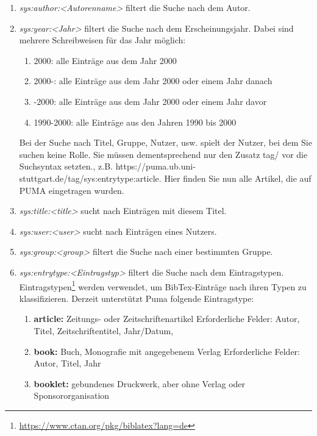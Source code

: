\documentclass[a4paper,11pt,twoside]{scrbook}
\begin{document}
\begin{enumerate}
    \item \textit{sys:author:<Autorenname>} filtert die Suche nach dem Autor.
    \item \textit{sys:year:<Jahr>} filtert die Suche nach dem Erscheinungsjahr. Dabei sind mehrere Schreibweisen für das Jahr möglich:
    \begin{enumerate}
        \item 2000: alle Einträge aus dem Jahr 2000
        \item 2000-: alle Einträge aus dem Jahr 2000 oder einem Jahr danach
        \item -2000: alle Einträge aus dem Jahr 2000 oder einem Jahr davor
        \item 1990-2000: alle Einträge aus den Jahren 1990 bis 2000
    \end{enumerate}
Bei der Suche nach Titel, Gruppe, Nutzer, usw. spielt der Nutzer, bei dem Sie suchen keine Rolle. Sie müssen dementsprechend nur den Zusatz tag/ vor die Suchsyntax setzten., z.B.  https://puma.ub.uni-stuttgart.de/tag/sys:entrytype:article. Hier finden Sie nun alle Artikel, die auf PUMA eingetragen wurden.
    \item \textit{sys:title:<title>} sucht nach Einträgen mit diesem Titel.
    \item \textit{sys:user:<user>} sucht nach Einträgen eines Nutzers.
    \item \textit{sys:group:<group>} filtert die Suche nach einer bestimmten Gruppe.
    \item \textit{sys:entrytype:<Eintragstyp>} filtert die Suche nach dem Eintragstypen. Eintragstypen\footnote{\url{https://www.ctan.org/pkg/biblatex?lang=de}} werden verwendet, um BibTex-Einträge nach ihren Typen zu klassifizieren. Derzeit unterstützt Puma folgende Eintragstype:
    \begin{enumerate}
        \item \textbf{article:} Zeitungs- oder Zeitschriftenartikel\newline
        Erforderliche Felder: Autor, Titel, Zeitschriftentitel, Jahr/Datum, %
        \item \textbf{book:} Buch, Monografie mit angegebenem Verlag\newline
        Erforderliche Felder: Autor, Titel, Jahr
        \item \textbf{booklet:} gebundenes Druckwerk, aber ohne Verlag oder Sponsororganisation\newline

\end{enumerate}
\end{enumerate}
\end{document}
